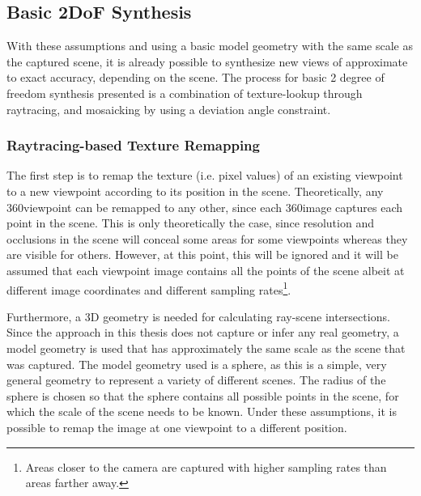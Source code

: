 \subsection{Basic 2DoF Synthesis}
With these assumptions and using a basic model geometry with the same scale as the captured scene, it is already possible to synthesize new views of approximate to exact accuracy, depending on the scene. The process for basic 2 degree of freedom synthesis presented is a combination of texture-lookup through raytracing, and mosaicking by using a deviation angle constraint.

\subsubsection{Raytracing-based Texture Remapping}
The first step is to remap the texture (i.e. pixel values) of an existing viewpoint to a new viewpoint according to its position in the scene. Theoretically, any 360\degree viewpoint can be remapped to any other, since each 360\degree image captures each point in the scene. This is only theoretically the case, since resolution and occlusions in the scene will conceal some areas for some viewpoints whereas they are visible for others. However, at this point, this will be ignored and it will be assumed that each viewpoint image contains all the points of the scene albeit at different image coordinates and different sampling rates\footnote{Areas closer to the camera are captured with higher sampling rates than areas farther away.}. 

Furthermore, a 3D geometry is needed for calculating ray-scene intersections. Since the approach in this thesis does not capture or infer any real geometry, a model geometry is used that has approximately the same scale as the scene that was captured. The model geometry used is a sphere, as this is a simple, very general geometry to represent a variety of different scenes. The radius of the sphere is chosen so that the sphere contains all possible points in the scene, for which the scale of the scene needs to be known. Under these assumptions, it is possible to remap the image at one viewpoint to a different position.


